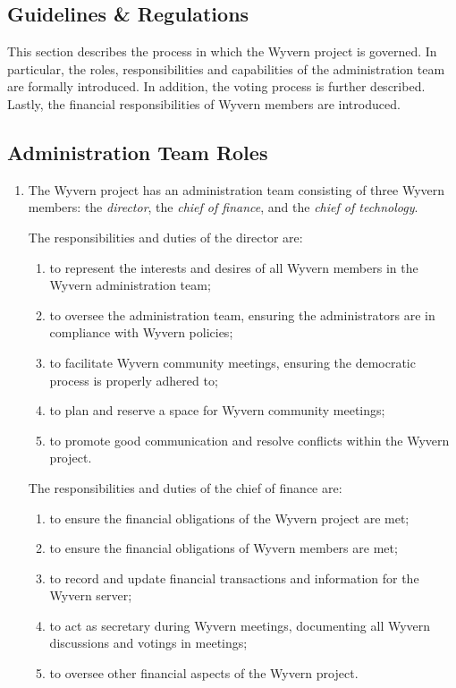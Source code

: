 \documentclass[a4paper]{article}
\begin{document}
\newpage
\begin{appendices}

\section{Guidelines \& Regulations}
\label{sec:bureaucracy}
This section describes the process in which the Wyvern project is governed. In particular, the roles, responsibilities and capabilities of the administration team are formally introduced. In addition, the voting process is further described. Lastly, the financial responsibilities of Wyvern members are introduced.

\subsection{Administration Team Roles}
\begin{enumerate}
    \item The Wyvern project has an administration team consisting of three Wyvern members: the \emph{director}, the \emph{chief of finance}, and the \emph{chief of technology}.
    
    \begin{item}
        The responsibilities and duties of the director are:
        \begin{enumerate}
            \item to represent the interests and desires of all Wyvern members in the Wyvern administration team;
            \item to oversee the administration team, ensuring the administrators are in compliance with Wyvern policies;
            \item to facilitate Wyvern community meetings, ensuring the democratic process is properly adhered to;
            \item to plan and reserve a space for Wyvern community meetings;
            \item to promote good communication and resolve conflicts within the Wyvern project.
        \end{enumerate}
    \end{item}

    \begin{item}
        The responsibilities and duties of the chief of finance are:
        \begin{enumerate}
            \item to ensure the financial obligations of the Wyvern project are met;
            \item to ensure the financial obligations of Wyvern members are met;
            \item to record and update financial transactions and information for the Wyvern server;
            \item to act as secretary during Wyvern meetings, documenting all Wyvern discussions and votings in meetings;
            \item to oversee other financial aspects of the Wyvern project.
        \end{enumerate}
    \end{item}


\end{enumerate}
\end{appendices}
\end{document}
